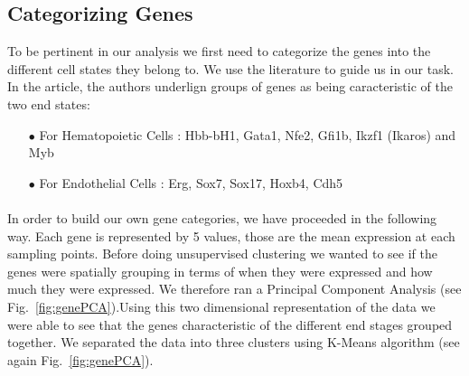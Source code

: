 \documentclass[a4paper,12pt]{book}
\theoremstyle{break}
\begin{document}
\subsection*{Categorizing Genes}
	 To be pertinent in our analysis we first need to categorize the genes into the different cell states they belong to. We use the literature to guide us in our task. In the article, the authors underlign groups of genes as being caracteristic of the two end states:
	\begin{itemize}
		\item[$\bullet$] For Hematopoietic Cells : Hbb-bH1, Gata1, Nfe2, Gfi1b, Ikzf1 (Ikaros) and Myb
		\item[$\bullet$] For Endothelial Cells : Erg, Sox7, Sox17, Hoxb4, Cdh5
	\end{itemize}
	\paragraph{}
	In order to build our own gene categories, we have proceeded in the following way. Each gene is represented by 5 values, those are the mean expression at each sampling points. Before doing unsupervised clustering we wanted to see if the genes were spatially grouping in terms of when they were expressed and how much they were expressed. We therefore ran a Principal Component Analysis (see Fig.~\ref{fig:genePCA}).Using this two dimensional representation of the data we were able to see that the genes characteristic of the different end stages grouped together. We separated the data into three clusters using K-Means algorithm (see again Fig.~\ref{fig:genePCA}).
	
\end{document}
